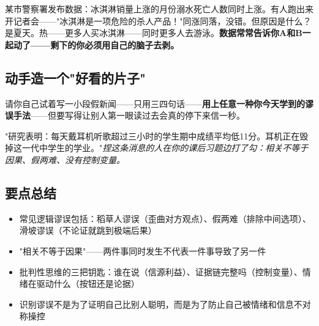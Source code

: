 \documentclass[a4paper,12pt]{ctexart}
\begin{document}
某市警察署发布数据：冰淇淋销量上涨的月份溺水死亡人数同时上涨。有人跑出来开记者会——"冰淇淋是一项危险的杀人产品！"同涨同落，没错。但原因是什么？是夏天。热——更多人买冰淇淋——同时更多人去游泳。\textbf{数据常常告诉你A和B一起动了——剩下的你必须用自己的脑子去剥。}

\subsection*{动手造一个"好看的片子"}

请你自己试着写一小段假新闻——只用三四句话——\textbf{用上任意一种你今天学到的谬误手法}——但要写得让别人第一眼读过去会真的停下来信一秒。

"研究表明：每天戴耳机听歌超过三小时的学生期中成绩平均低11分。耳机正在毁掉这一代中学生的学业。"\textit{捏这条消息的人在你的课后习题边打了勾：相关不等于因果、假两难、没有控制变量。}


\subsection*{要点总结}
\begin{itemize}
  \item 常见逻辑谬误包括：稻草人谬误（歪曲对方观点）、假两难（排除中间选项）、滑坡谬误（不论证就跳到极端后果）
  \item "相关不等于因果"——两件事同时发生不代表一件事导致了另一件
  \item 批判性思维的三把钥匙：谁在说（信源利益）、证据链完整吗（控制变量）、情绪在驱动什么（按钮还是论据）
  \item 识别谬误不是为了证明自己比别人聪明，而是为了防止自己被情绪和信息不对称操控
\end{itemize}
\end{document}
